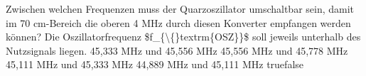     {Zwischen welchen Frequenzen muss der Quarzoszillator umschaltbar sein, damit im 70 cm-Bereich die oberen 4 MHz durch diesen Konverter empfangen werden können? Die Oszillatorfrequenz \$f\_\{\textbackslash\{\}textrm\{OSZ\}\}\$ soll jeweils unterhalb des Nutzsignals liegen.}
    {45,333 MHz und 45,556 MHz}
    {45,556 MHz und 45,778 MHz}
    {45,111 MHz und 45,333 MHz}
    {44,889 MHz und 45,111 MHz}
    {true}{false}
